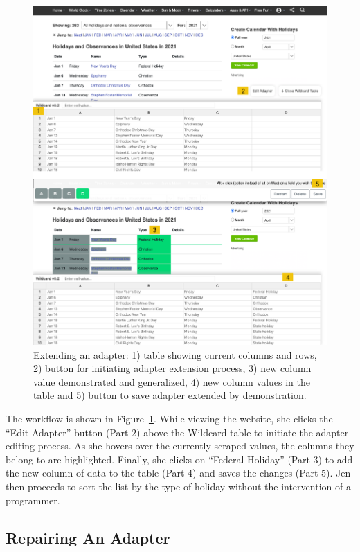 \documentclass[sigconf,10pt]{acmart}
\begin{document}
\begin{figure}
  \includegraphics[width=\textwidth]{media/extending.png}
  \caption{\label{fig:extending} Extending an adapter: 1) table showing current columns and rows, 2) button for initiating adapter extension process, 3) new column value demonstrated and generalized, 4) new column values in the table and 5) button to save adapter extended by demonstration.}
\end{figure}

The workflow is shown in Figure~\ref{fig:extending}. While viewing the
website, she clicks the ``Edit Adapter'' button (Part 2) above the
Wildcard table to initiate the adapter editing process. As she hovers
over the currently scraped values, the columns they belong to are
highlighted. Finally, she clicks on ``Federal Holiday'' (Part 3) to add
the new column of data to the table (Part 4) and saves the changes (Part
5). Jen then proceeds to sort the list by the type of holiday without
the intervention of a programmer.

\hypertarget{repairing-an-adapter}{%
\subsection{Repairing An Adapter}\label{repairing-an-adapter}}
\end{document}
